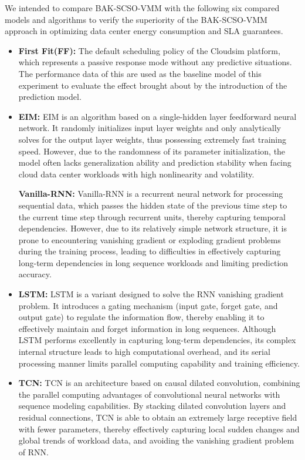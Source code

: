 \documentclass[conference]{{IEEEtran}}
\begin{document}
We intended to compare BAK-SCSO-VMM with the following six compared models and algorithms to verify the superiority of the BAK-SCSO-VMM approach in optimizing data center energy consumption and SLA guarantees.

\begin{itemize}

\item \textbf{First Fit(FF):} The default scheduling policy of the Cloudsim platform, which represents a passive response mode without any predictive situations. The performance data of this are used as the baseline model of this experiment to evaluate the effect brought about by the introduction of the prediction model.

\item \textbf{EIM:} EIM is an algorithm based on a single-hidden layer feedforward neural network. It randomly initializes input layer weights and only analytically solves for the output layer weights, thus possessing extremely fast training speed. However, due to the randomness of its parameter initialization, the model often lacks generalization ability and prediction stability when facing cloud data center workloads with high nonlinearity and volatility.

\textbf{Vanilla-RNN:} Vanilla-RNN is a recurrent neural network for processing sequential data, which passes the hidden state of the previous time step to the current time step through recurrent units, thereby capturing temporal dependencies. However, due to its relatively simple network structure, it is prone to encountering vanishing gradient or exploding gradient problems during the training process, leading to difficulties in effectively capturing long-term dependencies in long sequence workloads and limiting prediction accuracy.

\item \textbf{LSTM:} LSTM is a variant designed to solve the RNN vanishing gradient problem. It introduces a gating mechanism (input gate, forget gate, and output gate) to regulate the information flow, thereby enabling it to effectively maintain and forget information in long sequences. Although LSTM performs excellently in capturing long-term dependencies, its complex internal structure leads to high computational overhead, and its serial processing manner limits parallel computing capability and training efficiency.

\item \textbf{TCN:} TCN is an architecture based on causal dilated convolution, combining the parallel computing advantages of convolutional neural networks with sequence modeling capabilities. By stacking dilated convolution layers and residual connections, TCN is able to obtain an extremely large receptive field with fewer parameters, thereby effectively capturing local sudden changes and global trends of workload data, and avoiding the vanishing gradient problem of RNN.


\end{itemize}
\end{document}
